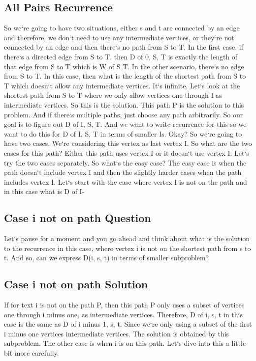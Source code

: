\subsection{All Pairs  Recurrence}
So we`re going to have two situations, either s and t are connected by an edge and therefore, we don`t need to use any intermediate vertices, or they`re not connected by an edge and then there`s no path from S to T\@.
In the first case, if there`s a directed edge from S to T, then D of 0, S, T is exactly the length of that edge from S to T which is W of S T\@.
In the other scenario, there`s no edge from S to T\@.
In this case, then what is the length of the shortest path from S to T which doesn`t allow any intermediate vertices.
It`s infinite.
Let`s look at the shortest path from S to T where we only allow vertices one through I as intermediate vertices.
So this is the solution.
This path P is the solution to this problem.
And if there`s multiple paths, just choose any path arbitrarily.
So our goal is to figure out D of I, S, T\@.
And we want to write recurrence for this so we want to do this for D of I, S, T in terms of smaller Is.
Okay? So we`re going to have two cases.
We`re considering this vertex as last vertex I\@.
So what are the two cases for this path? Either this path uses vertex I or it doesn`t use vertex I\@.
Let`s try the two cases separately.
So what`s the easy case? The easy case is when the path doesn`t include vertex I and then the slightly harder cases when the path includes vertex I\@.
Let`s start with the case where vertex I is not on the path and in this case what is D of I-

\subsection{Case  i not on path Question}
Let`s pause for a moment and you go ahead and think about what is the solution to the recurrence in this case, where vertex i is not on the shortest path from s to t.
And so, can we express D(i, s, t) in terms of smaller subproblem?

\subsection{Case  i not on path Solution}
If for text i is not on the path P, then this path P only uses a subset of vertices one through i minus one, as intermediate vertices.
Therefore, D of i, s, t in this case is the same as D of i minus 1, s, t.
Since we`re only using a subset of the first i minus one vertices intermediate vertices.
The solution is obtained by this subproblem.
The other case is when i is on this path.
Let`s dive into this a little bit more carefully.

